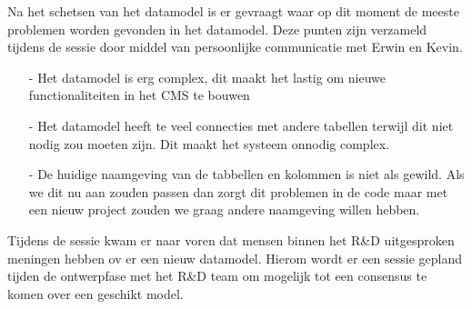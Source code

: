\whitespace[2]
Na het schetsen van het datamodel is er gevraagt waar op dit moment de meeste problemen worden gevonden in het datamodel.
Deze punten zijn verzameld tijdens de sessie door middel van persoonlijke communicatie met Erwin en Kevin.
\begin{itemize}
    \item[-]{Het datamodel is erg complex, dit maakt het lastig om nieuwe functionaliteiten in het CMS te bouwen}
    \item[-]{Het datamodel heeft te veel connecties met andere tabellen terwijl dit niet nodig zou moeten zijn.
        Dit maakt het systeem onnodig complex.}
    \item[-]{De huidige naamgeving van de tabbellen en kolommen is niet als gewild.
        Als we dit nu aan zouden passen dan zorgt dit problemen in de code maar met een nieuw project zouden we graag andere naamgeving willen hebben.}
\end{itemize}

\whitespace
Tijdens de sessie kwam er naar voren dat mensen binnen het R\&D uitgesproken meningen hebben ov er een nieuw datamodel.
Hierom wordt er een sessie gepland tijden de ontwerpfase met het R\&D team om mogelijk tot een consensus te komen over een geschikt model.



%
